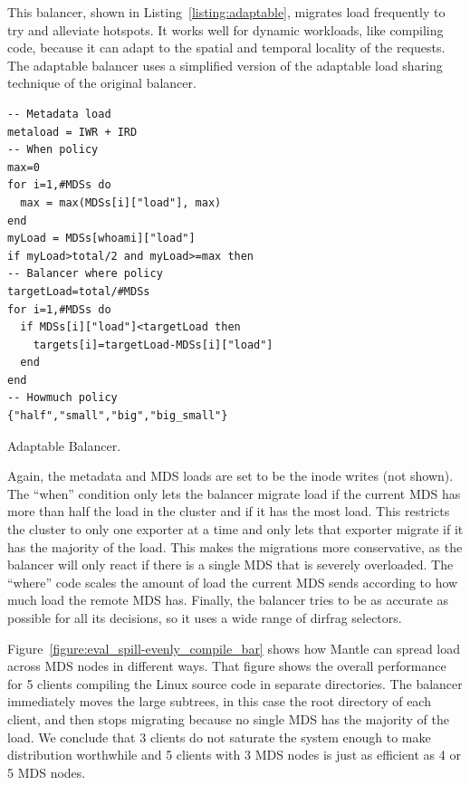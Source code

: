 This balancer, shown in Listing~\ref{listing:adaptable}, migrates load frequently to try and alleviate hotspots. It works well for dynamic workloads, like compiling code, because it can adapt to the spatial and temporal locality of the requests. The adaptable balancer uses a simplified version of the adaptable load sharing technique of the original balancer.

\begin{listing}
	\begin{verbatim}
-- Metadata load
metaload = IWR + IRD
-- When policy
max=0
for i=1,#MDSs do
  max = max(MDSs[i]["load"], max)
end
myLoad = MDSs[whoami]["load"]
if myLoad>total/2 and myLoad>=max then
-- Balancer where policy
targetLoad=total/#MDSs
for i=1,#MDSs do
  if MDSs[i]["load"]<targetLoad then
    targets[i]=targetLoad-MDSs[i]["load"]
  end
end
-- Howmuch policy
{"half","small","big","big_small"}
	\end{verbatim}
    \caption{Adaptable Balancer.\label{listing:adaptable}}
\end{listing}

Again, the metadata and MDS loads are set to be the inode writes (not shown). The ``when'' condition only lets the balancer migrate load if the current MDS has more than half the load in the cluster and if it has the most load. This restricts the cluster to only one exporter at a time and only lets that exporter migrate if it has the majority of the load. This makes the migrations more conservative, as the balancer will only react if there is a single MDS that is severely overloaded. The ``where'' code scales the amount of load the current MDS sends according to how much load the remote MDS has. Finally, the balancer tries to be as accurate as possible for all its decisions, so it uses a wide range of dirfrag selectors.

Figure~\ref{figure:eval_spill-evenly_compile_bar} shows how Mantle can spread load across MDS nodes in different ways. That figure shows the overall performance for 5 clients compiling the Linux source code in separate directories. The balancer immediately moves the large subtrees, in this case the root directory of each client, and then stops migrating because no single MDS has the majority of the load. We conclude that 3 clients do not saturate the system enough to make distribution worthwhile and 5 clients with 3 MDS nodes is just as efficient as 4 or 5 MDS nodes. 

